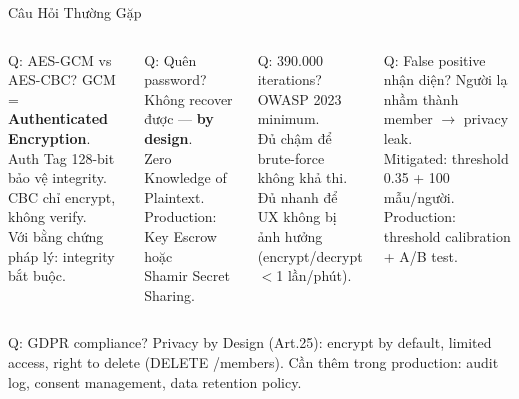 \documentclass[aspectratio=169, 12pt]{beamer}
\begin{document}
\begin{frame}{Câu Hỏi Thường Gặp}
\begin{columns}[T]
\begin{block}{Q: AES-GCM vs AES-CBC?}
\footnotesize
GCM = \textbf{Authenticated Encryption}.\\
Auth Tag 128-bit bảo vệ integrity.\\
CBC chỉ encrypt, không verify.\\
Với bằng chứng pháp lý: integrity bắt buộc.
\end{block}

\begin{block}{Q: Quên password?}
\footnotesize
Không recover được --- \textbf{by design}.\\
Zero Knowledge of Plaintext.\\
Production: Key Escrow hoặc\\
Shamir Secret Sharing.
\end{block}

\begin{block}{Q: 390.000 iterations?}
\footnotesize
OWASP 2023 minimum.\\
Đủ chậm để brute-force không khả thi.\\
Đủ nhanh để UX không bị ảnh hưởng\\
(encrypt/decrypt $<$1 lần/phút).
\end{block}

\begin{block}{Q: False positive nhận diện?}
\footnotesize
Người lạ nhầm thành member $\rightarrow$ privacy leak.\\
Mitigated: threshold 0.35 + 100 mẫu/người.\\
Production: threshold calibration + A/B test.
\end{block}
\end{columns}

\vspace{0.5em}
\begin{alertblock}{Q: GDPR compliance?}
\footnotesize
Privacy by Design (Art.25): encrypt by default, limited access, right to delete (DELETE /members).
Cần thêm trong production: audit log, consent management, data retention policy.
\end{alertblock}
\end{frame}
\end{document}
